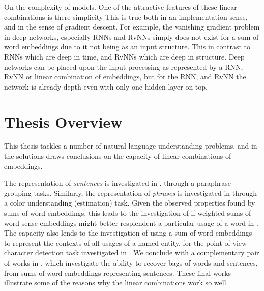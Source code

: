\documentclass{book}
\begin{document}
On the complexity of models.
One of the attractive features of these linear combinations is there simplicity
This is true both in an implementation sense, and in the sense of gradient descent.
For example, the vanishing gradient problem in deep networks, especially RNNs and RvNNs
simply does not exist for a sum of word embeddings due to it not being as an input structure.
This in contrast to RNNs which are deep in time, and RvNNs which are deep in structure.
Deep networks can be placed upon the input processing as represented by a RNN, RvNN or linear combination of embeddings,
but for the RNN, and RvNN the network is already depth even with only one hidden layer on top.



\section{Thesis Overview}
This thesis tackles a number of natural language understanding problems, and in the solutions draws conclusions on the capacity of linear combinations of embeddings.

The representation of \emph{sentences} is investigated in , through a paraphrase grouping tasks.
Similarly, the representation of \emph{phrases} is investigated in  through a color understanding (estimation) task.
Given the observed properties found by sums of word embeddings,
this leads to the investigation of if weighted sums of word sense embeddings might better resplendent a particular usage of a word in .
The capacity also lends to the investigation of using a sum of word embeddings to represent the contexts of all usages of a named entity, for the point of view character detection task investigated in .
We conclude with a complementary pair of works in  , which investigate the ability to recover bags of words and sentences, from sums of word embeddings representing sentences.
These final works illustrate some of the reasons why the linear combinations work so well.
\end{document}
